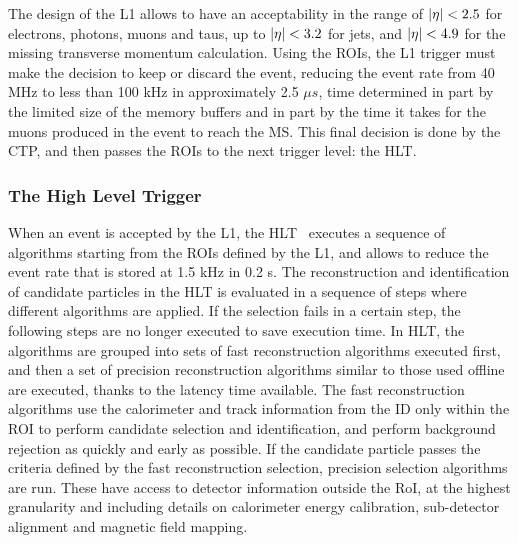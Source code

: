 The design of the \ac{L1} allows to have an acceptability in the range of \(|\eta|<2.5\) for electrons, photons, muons and taus, up to \(|\eta|<3.2\) for jets, and \(|\eta|<4.9\) for the missing transverse momentum calculation.
Using the \acp{ROI}, the \ac{L1} trigger must make the decision to keep or discard the event, reducing the event rate from 40 MHz to less than 100 kHz in approximately 2.5 \(\mu s\), time determined in part by the limited size of the memory buffers and in part by the time it takes for the muons produced in the event to reach the \ac{MS}. This final decision is done by the \ac{CTP}, and then passes the \acp{ROI} to the next trigger level: the \ac{HLT}.



\subsubsection{The High Level Trigger}


When an event is accepted by the \ac{L1}, the \ac{HLT}~\cite{ATLAS-HLTTrigger} executes a sequence of algorithms starting from the \acp{ROI} defined by the \ac{L1}, and allows to reduce the event rate that is stored at 1.5 kHz in 0.2 s. 
The reconstruction and identification of candidate particles in the \ac{HLT} is evaluated in a sequence of steps where different algorithms are applied. 
If the selection fails in a certain step, the following steps are no longer executed to save execution time. 
In \ac{HLT}, the algorithms are grouped into sets of fast reconstruction algorithms executed first, and then a set of precision reconstruction algorithms similar to those used offline are executed, thanks to the latency time available.
The fast reconstruction algorithms use the calorimeter and track information from the \ac{ID} only within the \ac{ROI} to perform candidate selection and identification, and perform background rejection as quickly and early as possible.
If the candidate particle passes the criteria defined by the fast reconstruction selection, precision selection algorithms are run. These have access to detector information outside the RoI, at the highest granularity and including details on calorimeter energy calibration, sub-detector alignment and magnetic field mapping.

